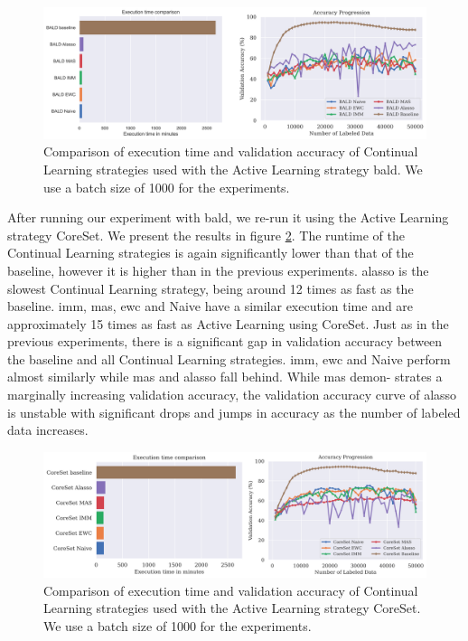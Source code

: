 \begin{figure}[h]
    \centering
    \includegraphics[width=\linewidth]{images/results_CAL/Bald_CAL_1000b.png}
    \caption[Continual Active Learning \gls{bald} 1000 batch size]{Comparison of execution time and validation accuracy of Continual Learning strategies used with the Active Learning strategy \gls{bald}.
    We use a batch size of 1000 for the experiments.}
    \label{fig:Evaluation:Results:CAL:BALD1000}
\end{figure}

After running our experiment with \gls{bald}, we re-run it using the Active Learning strategy CoreSet. We present the results in figure \ref{fig:Evaluation:Results:CAL:CoreSet1000}. The runtime of the 
Continual Learning strategies is again significantly lower than that of the baseline, however it is higher than in the previous experiments. \gls{alasso} is the slowest Continual Learning strategy, being
around 12 times as fast as the baseline. \gls{imm}, \gls{mas}, \gls{ewc} and Naive have a similar execution time and are approximately 15 times as fast as Active Learning using CoreSet. Just as in the previous experiments,
there is a significant gap in validation accuracy between the baseline and all Continual Learning strategies. \gls{imm}, \gls{ewc} and Naive perform almost similarly while \gls{mas} and \gls{alasso} fall behind. While \gls{mas} demon-
strates a marginally increasing validation accuracy, the validation accuracy curve of \gls{alasso} is unstable with significant drops and jumps in accuracy as the number of labeled data increases. \par

\begin{figure}[h]
    \centering
    \includegraphics[width=\linewidth]{images/results_CAL/CoreSet_CAL_1000b.png}
    \caption[Continual Active Learning CoreSet 1000 batch size]{Comparison of execution time and validation accuracy of Continual Learning strategies used with the Active Learning strategy
     CoreSet. We use a batch size of 1000 for the experiments. }
    \label{fig:Evaluation:Results:CAL:CoreSet1000}
\end{figure}

